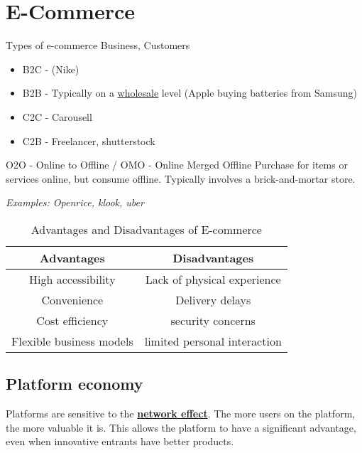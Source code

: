 \section{E-Commerce}

\begin{definition}
    {Types of e-commerce}
    Business, Customers
    \begin{itemize}
        \item B2C - (Nike)
        \item B2B - Typically on a \underline{wholesale} level (Apple buying batteries from Samsung)
        \item C2C - Carousell
        \item C2B - Freelancer, shutterstock
    \end{itemize}
\end{definition}

\begin{knBox}
    {O2O - Online to Offline / OMO - Online Merged Offline}
    Purchase for items or services online, but consume offline. Typically involves a brick-and-mortar store.

    \textit{Examples: Openrice, klook, uber}
\end{knBox}

\begin{table}[h!]
    \centering
    \begin{tabular}{|c|c|}
        \hline
        \textbf{Advantages}      & \textbf{Disadvantages}       \\
        \hline
        High accessibility       & Lack of physical experience  \\
        Convenience              & Delivery delays              \\
        Cost efficiency          & security concerns            \\
        Flexible business models & limited personal interaction \\
        \hline
    \end{tabular}
    \caption{Advantages and Disadvantages of E-commerce}
    \label{tab:econ_ad}
\end{table}

\subsection{Platform economy}
\label{subsec:platform}

Platforms are sensitive to the \hyperref[def:network]{\textbf{network effect}}. The more users on the platform, the more valuable it is. This allows the platform to have a significant advantage, even when innovative entrants have better products.


